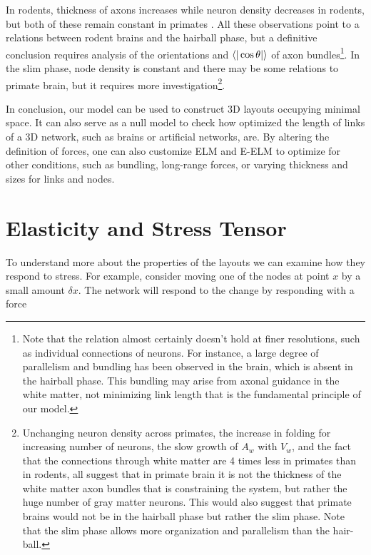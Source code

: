 \documentclass[nofootinbib,preprint,endfloats]{revtex4} %
\begin{document}
In rodents, thickness of axons increases while neuron density decreases in rodents, but both of these remain constant in primates \cite{herculano2012remarkable}. All these observations point to a relations between rodent brains and the hairball phase, but a definitive conclusion requires analysis of the orientations and $\be{|\cos\theta|}$ of axon bundles\footnote{
Note that the relation almost certainly doesn't hold at finer resolutions, such as individual connections of neurons. 
For instance, a large degree of parallelism and bundling has been observed in the brain\cite{le2001diffusion,assaf2008diffusion}, which is absent in the hairball phase. This bundling may arise from axonal guidance in the white matter, not minimizing link length that is the fundamental principle of our model.}. 
In the slim phase, node density is constant and there may be some relations to primate brain, but it requires more investigation\footnote{
Unchanging neuron density across primates, the increase in folding for increasing number of neurons, the slow growth of $A_w$ with $V_w$, and the fact that the connections through white matter are 4 times less in primates than in rodents\cite{herculano2012remarkable}, all suggest that in primate brain it is not the thickness of the white matter axon bundles that is constraining the system, but rather the huge number of gray matter neurons. 
This would also suggest that primate brains would not be in the hairball phase but rather the slim phase. Note that the slim phase allows more organization and parallelism than the hair-ball.}.


In conclusion, our model can be used to construct 3D layouts occupying minimal space. It can also serve  as a null model to check how optimized the length of links of a 3D network, such as brains or artificial networks, are. By altering the definition  of forces, one can also customize ELM and E-ELM to optimize for other conditions, such as bundling, long-range forces, or varying thickness and sizes for links and nodes. 

\section{Elasticity and Stress Tensor}
To understand more about the properties of the layouts we can examine how they respond to stress. For example, consider moving one of the nodes at point $x$ by a small amount $\delta x$. The network will respond to the change by responding with a force
\end{document}
